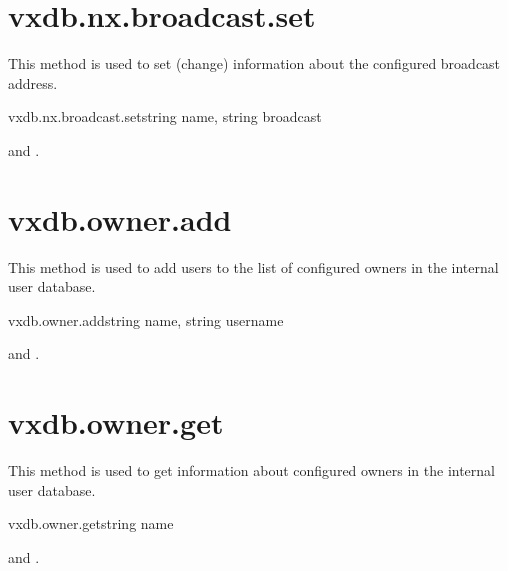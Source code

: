 \section{vxdb.nx.broadcast.set}

This method is used to set (change) information about the configured broadcast
address.

\begin{rpcsynopsis}{vxdb.nx.broadcast.set}{string name, string broadcast}
\end{rpcsynopsis}

\begin{rpcaccess}
 and \rpcownerchecks.
\end{rpcaccess}

\rpcreturnnil

\rpcnoerrors


\section{vxdb.owner.add}

This method is used to add users to the list of configured owners in the
internal user database.

\begin{rpcsynopsis}{vxdb.owner.add}{string name, string username}
\end{rpcsynopsis}

\begin{rpcaccess}
 and \rpcnoownerchecks.
\end{rpcaccess}

\rpcreturnnil

\rpcnoerrors


\section{vxdb.owner.get}

This method is used to get information about configured owners in the internal
user database.

\begin{rpcsynopsis}{vxdb.owner.get}{string name}
\end{rpcsynopsis}

\begin{rpcaccess}
 and \rpcnoownerchecks.
\end{rpcaccess}

